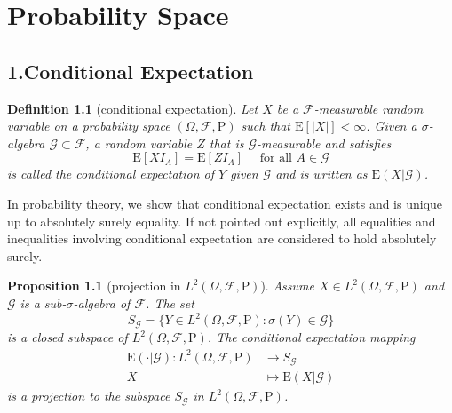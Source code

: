 \documentclass{report}
\newtheorem{definition}{Definition}[section]
\newtheorem{proposition}{Proposition}[section]
\theoremstyle{nonumberplain}
\begin{document}
\chapter{Probability Space}
\section*{1.Conditional Expectation}
\begin{definition}[conditional expectation]
	Let $X$ be a $\mathcal{F}$-measurable random variable on a probability space $(\Omega,\mathcal{F},\mathrm{P})$ such that $\mathrm{E}[\left|X\right|] < \infty$. Given a $\sigma$-algebra $\mathcal{G}\subset\mathcal{F}$, a random variable $Z$ that is $\mathcal{G}$-measurable and satisfies 
	\[
	\mathrm{E}[X I_A] = \mathrm{E}[ZI_A] \quad\text{ for all }A \in \mathcal{G}
	\] 
	is called the \emph{conditional expectation} of $Y$ given $\mathcal{G}$ and is written as $\mathrm{E}(X|\mathcal{G})$.
\end{definition}
In probability theory, we show that conditional expectation exists and is unique up to absolutely surely equality. If not pointed out explicitly, all equalities and inequalities involving conditional expectation are considered to hold absolutely surely. 

\begin{proposition}[projection in $L^2(\Omega,\mathcal{F},\mathrm{P})$]
	Assume $X\in L^2(\Omega,\mathcal{F},\mathrm{P})$ and $\mathcal{G}$ is a sub-$\sigma$-algebra of $\mathcal{F}$. The set
	\[
	S_\mathcal{G}=\{Y\in L^2(\Omega,\mathcal{F},\mathrm{P}):\sigma(Y)\in \mathcal{G}\}
	\]
	is a closed subspace of $L^2(\Omega,\mathcal{F},\mathrm{P})$.
	The conditional expectation mapping
	\begin{align*}
	\mathrm{E}(\cdot|\mathcal{G}):L^2(\Omega,\mathcal{F},\mathrm{P})&\longrightarrow S_\mathcal{G}\\
	X&\longmapsto \mathrm{E}(X|\mathcal{G})
	\end{align*}
	is a projection to the subspace $S_\mathcal{G}$ in $L^2(\Omega,\mathcal{F},\mathrm{P})$.
\end{proposition}
\end{document}
